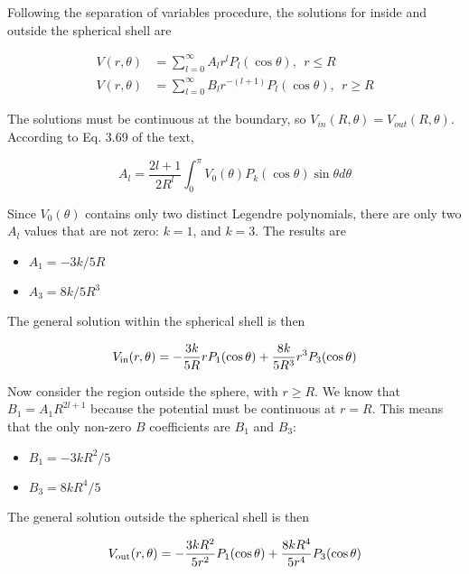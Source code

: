 \documentclass[10pt]{article}
\begin{document}
Following the separation of variables procedure, the solutions for inside and outside the spherical shell are

\begin{align}
V(r,\theta) &= \sum_{l=0}^{\infty} A_l r^l P_l(\cos\theta), ~~ r\leq R \\
V(r,\theta) &= \sum_{l=0}^{\infty} B_l r^{-(l+1)} P_l(\cos\theta), ~~ r\geq R
\end{align}

The solutions must be continuous at the boundary, so $V_{in}(R,\theta) = V_{out}(R,\theta)$.  According to Eq. 3.69 of the text,

\begin{equation}
A_l = \frac{2l+1}{2R^l}\int_0^\pi V_0(\theta)P_k(\cos\theta)\sin\theta d\theta
\end{equation}

Since $V_0(\theta)$ contains only two distinct Legendre polynomials, there are only two $A_l$ values that are not zero: $k = 1$, and $k = 3$.  The results are

\begin{itemize}
\item $A_1 = -3k/5R$
\item $A_3 = 8k/5R^3$
\end{itemize}

The general solution within the spherical shell is then

\begin{equation}
V_{\rm in}(r,\theta) = -\frac{3k}{5R} r P_1(\cos\theta) + \frac{8k}{5R^3} r^3 P_3(\cos\theta)
\end{equation}

Now consider the region outside the sphere, with $r \geq R$.  We know that $B_1 = A_1 R^{2l+1}$ because the potential must be continuous at $r = R$.  This means that the only non-zero $B$ coefficients are $B_1$ and $B_3$:

\begin{itemize}
\item $B_1 = -3k R^2/5$
\item $B_3 = 8k R^4/5$
\end{itemize}

The general solution outside the spherical shell is then

\begin{equation}
V_{\rm out}(r,\theta) = -\frac{3kR^2}{5r^2} P_1(\cos\theta) + \frac{8k R^4}{5r^4} P_3(\cos\theta)
\end{equation}
\end{document}
